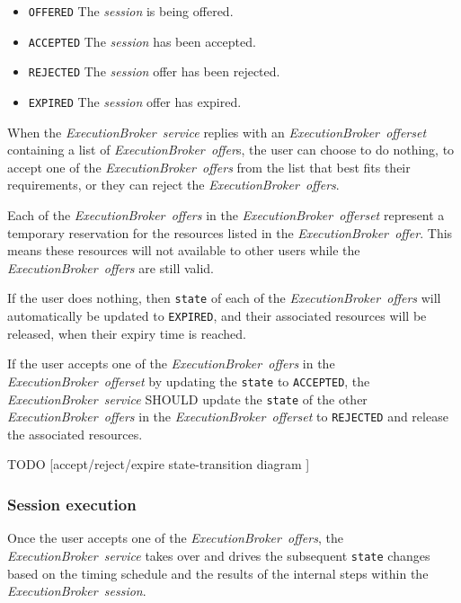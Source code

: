 \documentclass[11pt,a4paper]{ivoa}
\newcommand{\execbrokerservice}[1] {\textit{ExecutionBroker~service#1}}
\newcommand{\execbrokersession}[1] {\textit{ExecutionBroker~session#1}}
\newcommand{\execbrokerstate}[1] {\codeword{state#1}}
\newcommand{\execoffer}[1] {\textit{ExecutionBroker~offer#1}}
\newcommand{\execofferset}[1] {\textit{ExecutionBroker~offerset#1}}
\newcommand{\workerjob}[1] {\textit{session#1}}
\newcommand{\codeword}[1] {\texttt{#1}}
\begin{document}
\begin{itemize}
    \item \codeword{OFFERED}    The \workerjob{} is being offered.
    \item \codeword{ACCEPTED}   The \workerjob{} has been accepted.
    \item \codeword{REJECTED}   The \workerjob{} offer has been rejected.
    \item \codeword{EXPIRED}    The \workerjob{} offer has expired.
\end{itemize}

When the \execbrokerservice{} replies with an \execofferset{} containing
a list of \execoffer{}s, the user can choose to do nothing, to accept one of the
\execoffer{s} from the list that best
fits their requirements, or they can reject the \execoffer{s}.

Each of the \execoffer{s} in the \execofferset{} represent a temporary reservation
for the resources listed in the \execoffer{}.
This means these resources will not available to other users while the \execoffer{s}
are still valid.

If the user does nothing, then \execbrokerstate{} of each of the \execoffer{s} will
automatically be updated to \codeword{EXPIRED}, and their associated resources will
be released, when their expiry time is reached.

If the user accepts one of the \execoffer{s} in the \execofferset{} by updating
the \execbrokerstate{} to \codeword{ACCEPTED}, the \execbrokerservice{} SHOULD
update the \execbrokerstate{} of the other \execoffer{s} in the \execofferset{} to
\codeword{REJECTED} and release the associated resources.

TODO [accept/reject/expire state-transition diagram ]

\subsubsection{Session execution}
\label{subsub-session-execution}

Once the user accepts one of the \execoffer{s}, the \execbrokerservice{} takes over and
drives the subsequent \execbrokerstate{} changes based on the timing schedule and
the results of the internal steps within the \execbrokersession{}.
\end{document}
